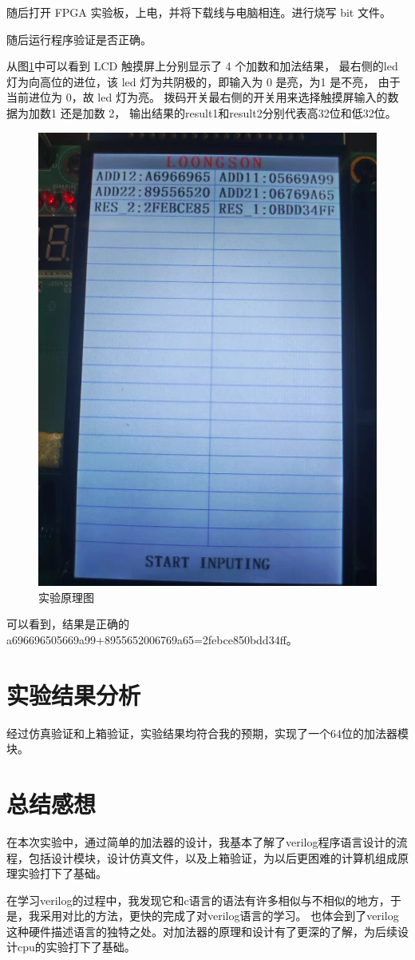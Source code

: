 \documentclass{ctexart}
\begin{document}
随后打开 FPGA 实验板，上电，并将下载线与电脑相连。进行烧写 bit 文件。

随后运行程序验证是否正确。

从图\ref{box}中可以看到 LCD 触摸屏上分别显示了 4 个加数和加法结果，
最右侧的led 灯为向高位的进位，该 led 灯为共阴极的，即输入为 0 是亮，为1 是不亮，
由于当前进位为 0，故 led 灯为亮。
拨码开关最右侧的开关用来选择触摸屏输入的数据为加数1 还是加数 2，
输出结果的result1和result2分别代表高32位和低32位。
\begin{figure}[ht]
    \centering
    \includegraphics[width=1\textwidth]{./figures/box.jpg}
    \caption{实验原理图}
    \label{box}
\end{figure}
可以看到，结果是正确的a696696505669a99+8955652006769a65=2febce850bdd34ff。
\section{实验结果分析}
经过仿真验证和上箱验证，实验结果均符合我的预期，实现了一个64位的加法器模块。
\section{总结感想}
在本次实验中，通过简单的加法器的设计，我基本了解了verilog程序语言设计的流程，包括设计模块，设计仿真文件，以及上箱验证，为以后更困难的计算机组成原理实验打下了基础。

在学习verilog的过程中，我发现它和c语言的语法有许多相似与不相似的地方，于是，我采用对比的方法，更快的完成了对verilog语言的学习。
也体会到了verilog这种硬件描述语言的独特之处。对加法器的原理和设计有了更深的了解，为后续设计cpu的实验打下了基础。
\end{document}

